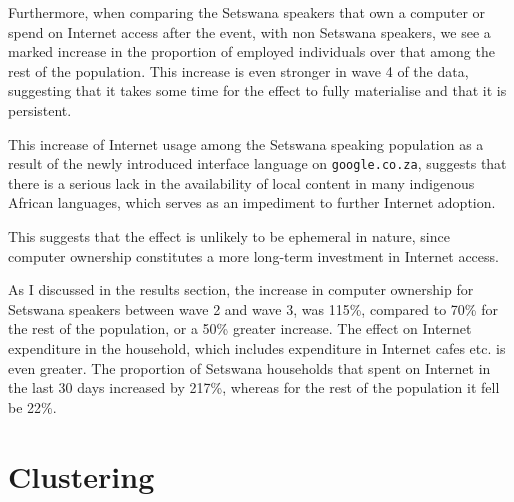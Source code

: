 \documentclass[a4paper,british]{article}\usepackage[]{graphicx}\usepackage[]{xcolor}
\providecommand*{\code}[1]{\texttt{#1}}
\begin{document}
Furthermore, when comparing the Setswana speakers that own a computer
or spend on Internet access after the event, with non Setswana speakers,
we see a marked increase in the proportion of employed individuals
over that among the rest of the population. This increase is even
stronger in wave 4 of the data, suggesting that it takes some time
for the effect to fully materialise and that it is persistent.

This increase of Internet usage among the Setswana speaking population
as a result of the newly introduced interface language on \code{google.co.za},
suggests that there is a serious lack in the availability of local
content in many indigenous African languages, which serves as an impediment
to further Internet adoption. 

 This suggests that the effect is unlikely to be ephemeral in nature,
since computer ownership constitutes a more long-term investment in
Internet access.

As I discussed in the results section, the increase in computer ownership
for Setswana speakers between wave 2 and wave 3, was 115\%, compared
to 70\% for the rest of the population, or a 50\% greater increase.
The effect on Internet expenditure in the household, which includes
expenditure in Internet cafes etc. is even greater. The proportion
of Setswana households that spent on Internet in the last 30 days
increased by 217\%, whereas for the rest of the population it fell
be 22\%.

\newpage{}

\printbibliography


\appendix

\section{Clustering}
\end{document}
